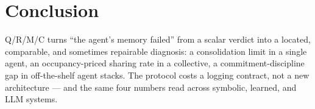 \documentclass[letterpaper]{article} %
\begin{document}
\section{Conclusion}

Q/R/M/C turns ``the agent's memory failed'' from a scalar verdict
into a located, comparable, and sometimes repairable diagnosis: a
consolidation limit in a single agent, an occupancy-priced sharing
rate in a collective, a commitment-discipline gap in off-the-shelf
agent stacks. The protocol costs a logging contract, not a new
architecture --- and the same four numbers read across symbolic,
learned, and LLM systems.



\def\isChecklistMainFile{}

\end{document}
